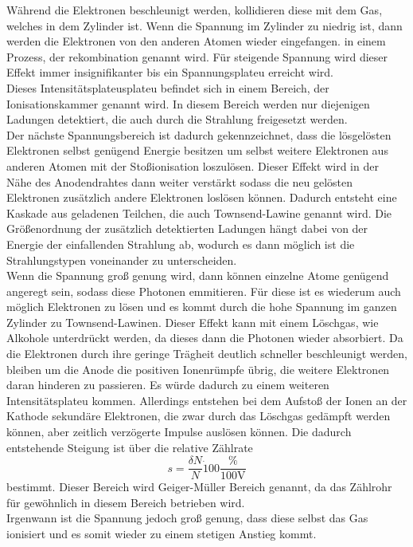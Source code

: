 \noindent Während die Elektronen beschleunigt werden, kollidieren diese mit dem Gas, welches in dem  Zylinder ist.
Wenn die Spannung im Zylinder zu niedrig ist, dann werden die Elektronen von den anderen Atomen wieder eingefangen.
in einem Prozess, der rekombination genannt wird. Für steigende Spannung wird dieser Effekt immer insignifikanter bis
ein Spannungsplateu erreicht wird. \\
\noindent Dieses Intensitätsplateusplateu befindet sich in einem Bereich, der Ionisationskammer genannt wird. In diesem Bereich
werden nur diejenigen Ladungen detektiert, die auch durch die Strahlung freigesetzt werden.\\
\noindent Der nächste Spannungsbereich ist dadurch gekennzeichnet, dass die lösgelösten Elektronen selbst genügend Energie
besitzen um selbst weitere Elektronen aus anderen Atomen mit der Stoßionisation loszulösen. Dieser Effekt wird in der 
Nähe des Anodendrahtes dann weiter verstärkt sodass die neu gelösten Elektronen zusätzlich andere Elektronen loslösen
können. Dadurch entsteht eine Kaskade aus geladenen Teilchen, die auch Townsend-Lawine genannt wird. Die Größenordnung
der zusätzlich detektierten Ladungen hängt dabei von der Energie der einfallenden Strahlung ab, wodurch es dann möglich
ist die Strahlungstypen voneinander zu unterscheiden.\\
\noindent Wenn die Spannung groß genung wird, dann können einzelne Atome genügend angeregt sein, sodass diese Photonen
emmitieren. Für diese ist es wiederum auch möglich Elektronen zu lösen und es kommt durch die hohe Spannung im ganzen
Zylinder zu Townsend-Lawinen. Dieser Effekt kann mit einem Löschgas, wie Alkohole unterdrückt werden, da dieses dann die
Photonen wieder absorbiert.  Da die Elektronen durch ihre geringe Trägheit deutlich schneller beschleunigt werden,
bleiben um die Anode die positiven Ionenrümpfe übrig, die weitere Elektronen daran hinderen zu passieren. Es würde dadurch 
zu einem weiteren Intensitätsplateu kommen. Allerdings entstehen bei dem Aufstoß der Ionen an der Kathode sekundäre
Elektronen, die zwar durch das Löschgas gedämpft werden können, aber zeitlich verzögerte Impulse auslösen können.
Die dadurch entstehende Steigung ist über die relative Zählrate
\begin{equation}
    s=\frac{\delta N}{N} \dot 100\frac{\unit{\percent}}{100\unit{\volt}}
    \label{eqn:relativ}
\end{equation}
bestimmt. Dieser Bereich wird Geiger-Müller Bereich genannt, da das Zählrohr für gewöhnlich in diesem Bereich betrieben wird.\\
\noindent Irgenwann ist die Spannung jedoch groß genung, dass diese selbst das Gas ionisiert und es somit wieder zu einem 
stetigen Anstieg kommt.

